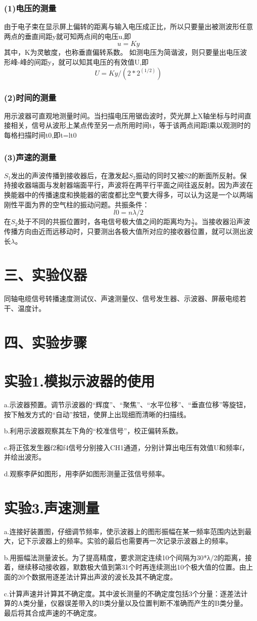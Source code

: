 \documentclass[11pt,a4paper,oneside]{article}
\begin{document}
\subsubsection*{(1)电压的测量}
由于电子束在显示屏上偏转的距离与输入电压成正比，所以只要量出被测波形任意两点的垂直间距y就可知两点间的电压u,即
$$u=Ky$$
其中，K为灵敏度，也称垂直偏转系数。
如测电压为简谐波，则只要量出电压波形峰-峰的间距y，就可以知其电压的有效值U,即    
$$U=Ky/(2*2^(1/2))$$
\subsubsection*{(2)时间的测量}
用示波器可直观地测量时间。当扫描电压用锯齿波时，荧光屏上X轴坐标与时间直接相关，信号从波形上某点传至另一点所用时间t，等于该两点间距l乘以观测时的每格扫描时间t0,即t=lt0
\subsubsection*{(3)声速的测量}
$S_1$发出的声波传播到接收器后，在激发起$S_2$振动的同时又被S2的断面所反射。保持接收器端面与发射器端面平行，声波将在两平行平面之间往返反射。因为声波在换能器中的传播速度和换能器的密度都比空气要大得多，可以认为这是一个以两端刚性平面为界的空气柱的振动问题。共振条件：
                    $$l0=nλ/2$$
在$S_2$处于不同的共振位置时，各电信号极大值之间的距离均为$\displaystyle\frac{\lambda}{2}$。当接收器沿声波传播方向由近而远移动时，只要测出各极大值所对应的接收器位置，就可以测出波长$\lambda$。

\section*{三、实验仪器}
同轴电缆信号转播速度测试仪、声速测量仪、信号发生器、示波器、屏蔽电缆若干、温度计。

\section*{四、实验步骤}
\section*{实验1.模拟示波器的使用}
a.示波器预置。调节示波器的“辉度”、“聚焦”、“水平位移”、“垂直位移”等旋钮，按下触发方式的“自动”按钮，使屏上出现细而清晰的扫描线。

b.利用示波器观察其左下角的“校准信号”，校正偏转系数。

c.将正弦发生器f2和f4信号分别接入CH1通道，分别计算出电压有效值U和频率f，并绘出波形。

d.观察李萨如图形，用李萨如图形测量正弦信号频率。
\section*{实验3.声速测量}
a.连接好装置图，仔细调节频率，使示波器上的图形振幅在某一频率范围内达到最大，记下示波器上的频率。实验的最后也需要再一次记录示波器上的频率。

b.用振幅法测量波长。为了提高精度，要求测定连续10个间隔为30*λ/2的距离，接着，继续移动接收器，默数极大值到第31个时再连续测出10个极大值的位置。由上面的20个数据用逐差法计算出声波的波长及其不确定度。

c.计算声速并计算其不确定度。其中波长测量的不确定度包括3个分量：逐差法计算的A类分量，仪器误差带入的B类分量以及位置判断不准确而产生的B类分量。最后将其合成声速的不确定度。
\end{document}
